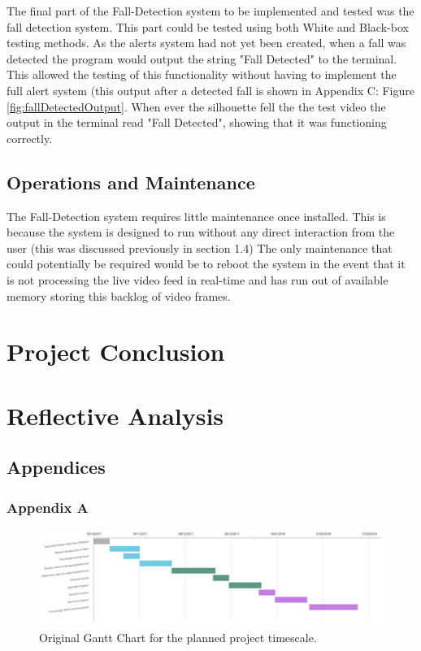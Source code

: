 \documentclass[11pt,a4paper]{report}
\begin{document}
The final part of the Fall-Detection system to be implemented and tested was the fall detection system. This part could be tested using both White and Black-box testing methods. As the alerts system had not yet been created, when a fall was detected the program would output the string "Fall Detected" to the terminal. This allowed the testing of this functionality without having to implement the full alert system (this output after a detected fall is shown in Appendix C: Figure \ref{fig:fallDetectedOutput}. When ever the silhouette fell the the test video the output in the terminal read "Fall Detected", showing that it was functioning correctly.

\section{Operations and Maintenance}

The Fall-Detection system requires little maintenance once installed. This is because the system is designed to run without any direct interaction from the user (this was discussed previously in section 1.4) The only maintenance that could potentially be required would be to reboot the system in the event that it is not processing the live video feed in real-time and has run out of available memory storing this backlog of video frames.

\chapter{Project Conclusion}

\chapter{Reflective Analysis}


\renewcommand\bibname{References}

\pagebreak
\clearpage

\appendix
\section{Appendices}
\subsection{Appendix A}

\begin{figure}[h]
 \centering
 \includegraphics[scale = 0.33]{Original_gantt_chart.png}
 \caption{Original Gantt Chart for the planned project timescale.}
 \label{fig:OriginalGantt}
\end{figure}
\end{document}
